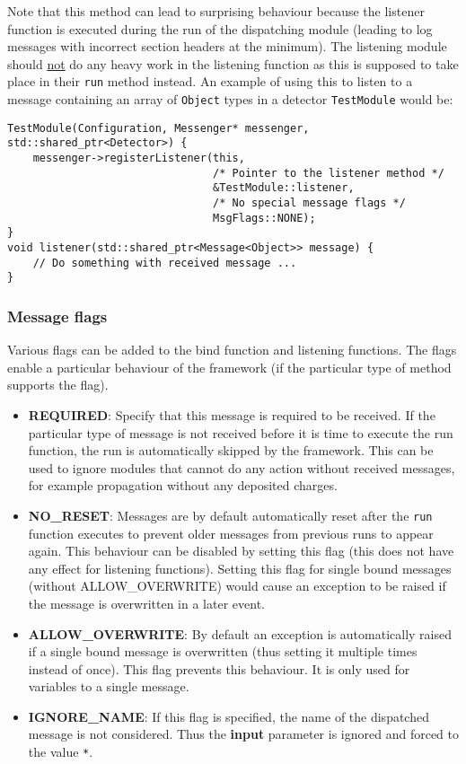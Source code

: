 \begin{enumerate}
Note that this method can lead to surprising behaviour because the listener function is executed during the run of the dispatching module (leading to log messages with incorrect section headers at the minimum).
The listening module should \underline{not} do any heavy work in the listening function as this is supposed to take place in their \texttt{run} method instead.
An example of using this to listen to a message containing an array of \texttt{Object} types in a detector \texttt{TestModule} would be:
\begin{verbatim}
TestModule(Configuration, Messenger* messenger, std::shared_ptr<Detector>) {
    messenger->registerListener(this,
                                /* Pointer to the listener method */
                                &TestModule::listener,
                                /* No special message flags */
                                MsgFlags::NONE);
}
void listener(std::shared_ptr<Message<Object>> message) {
    // Do something with received message ...
}
\end{verbatim}
\end{enumerate}

\subsubsection{Message flags}
Various flags can be added to the bind function and listening functions.
The flags enable a particular behaviour of the framework (if the particular type of method supports the flag).
\begin{itemize}
\item \textbf{REQUIRED}: Specify that this message is required to be received.
If the particular type of message is not received before it is time to execute the run function, the run is automatically skipped by the framework.
This can be used to ignore modules that cannot do any action without received messages, for example propagation without any deposited charges.
\item \textbf{NO\_RESET}: Messages are by default automatically reset after the \texttt{run} function executes to prevent older messages from previous runs to appear again.
This behaviour can be disabled by setting this flag (this does not have any effect for listening functions).
Setting this flag for single bound messages (without ALLOW\_OVERWRITE) would cause an exception to be raised if the message is overwritten in a later event.
\item \textbf{ALLOW\_OVERWRITE}: By default an exception is automatically raised if a single bound message is overwritten (thus setting it multiple times instead of once).
This flag prevents this behaviour.
It is only used for variables to a single message.
\item \textbf{IGNORE\_NAME}: If this flag is specified, the name of the dispatched message is not considered.
Thus the \textbf{input} parameter is ignored and forced to the value \texttt{*}.
\end{itemize}

